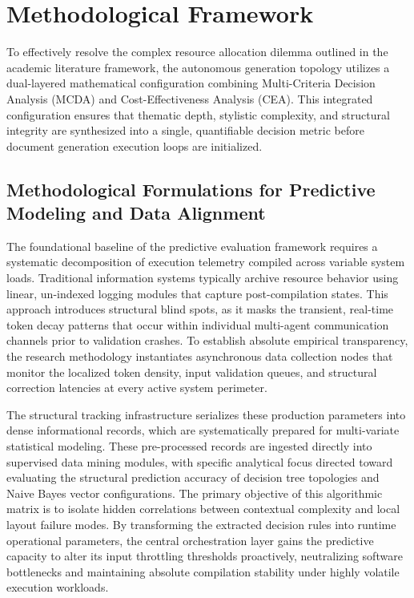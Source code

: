 \section{Methodological Framework}
To effectively resolve the complex resource allocation dilemma outlined in the academic literature framework, the autonomous generation topology utilizes a dual-layered mathematical configuration combining Multi-Criteria Decision Analysis (MCDA) and Cost-Effectiveness Analysis (CEA). This integrated configuration ensures that thematic depth, stylistic complexity, and structural integrity are synthesized into a single, quantifiable decision metric before document generation execution loops are initialized.

\subsection{Methodological Formulations for Predictive Modeling and Data Alignment}
The foundational baseline of the predictive evaluation framework requires a systematic decomposition of execution telemetry compiled across variable system loads. Traditional information systems typically archive resource behavior using linear, un-indexed logging modules that capture post-compilation states. This approach introduces structural blind spots, as it masks the transient, real-time token decay patterns that occur within individual multi-agent communication channels prior to validation crashes. To establish absolute empirical transparency, the research methodology instantiates asynchronous data collection nodes that monitor the localized token density, input validation queues, and structural correction latencies at every active system perimeter.

The structural tracking infrastructure serializes these production parameters into dense informational records, which are systematically prepared for multi-variate statistical modeling. These pre-processed records are ingested directly into supervised data mining modules, with specific analytical focus directed toward evaluating the structural prediction accuracy of decision tree topologies and Naive Bayes vector configurations. The primary objective of this algorithmic matrix is to isolate hidden correlations between contextual complexity and local layout failure modes. By transforming the extracted decision rules into runtime operational parameters, the central orchestration layer gains the predictive capacity to alter its input throttling thresholds proactively, neutralizing software bottlenecks and maintaining absolute compilation stability under highly volatile execution workloads.

